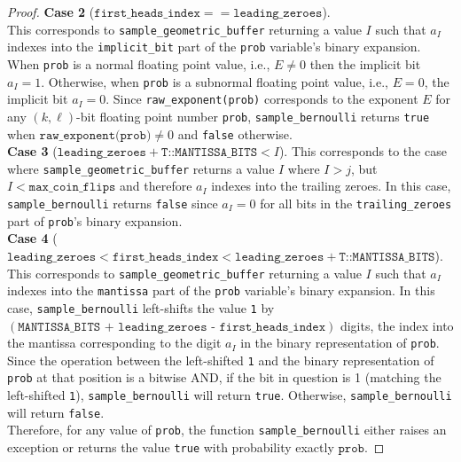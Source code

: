 \documentclass[11pt,a4paper]{article}
\theoremstyle{definition}
\begin{document}
\begin{proof}
\noindent\textbf{Case 2} ($\texttt{first\_heads\_index} == \texttt{leading\_zeroes}$). \\
\noindent This corresponds to \texttt{sample\_geometric\_buffer} returning a value $I$ such that $a_I$ indexes into the \texttt{implicit\_bit} part of the  \texttt{prob} variable's binary expansion. When \texttt{prob} is a normal floating point value, i.e., $E \ne 0$ then the implicit bit $a_I = 1$. Otherwise, when \texttt{prob} is a subnormal floating point value, i.e., $E = 0$, the implicit bit $a_I = 0$. Since \texttt{raw\_exponent(prob)} corresponds to the exponent $E$ for any $(k,\ell)$-bit floating point number \texttt{prob}, \texttt{sample\_bernoulli} returns \texttt{true} when $\texttt{raw\_exponent(prob)} \ne 0$ and \texttt{false} otherwise. \\


\noindent\textbf{Case 3} ($\texttt{leading\_zeroes}  + \texttt{T::MANTISSA\_BITS} < I$). This corresponds to the case where  \texttt{sample\_geometric\_buffer} returns a value $I$ where $I > j$, but $I < \texttt{max\_coin\_flips}$ and therefore $a_I$ indexes into the trailing zeroes. In this case, \texttt{sample\_bernoulli} returns \texttt{false} since $a_I = 0$ for all bits in the \texttt{trailing\_zeroes} part of \texttt{prob}'s binary expansion. \\

\noindent\textbf{Case 4} ($ \texttt{leading\_zeroes} < \texttt{first\_heads\_index}  <  \texttt{leading\_zeroes}  + \texttt{T::MANTISSA\_BITS}$). \\
\noindent This corresponds to \texttt{sample\_geometric\_buffer} returning a value $I$ such that $a_I$ indexes into the \texttt{mantissa} part of the  \texttt{prob} variable's binary expansion. In this case, 
\texttt{sample\_bernoulli}  left-shifts the value \texttt{1} by  $(\texttt{MANTISSA\_BITS + leading\_zeroes - first\_heads\_index})$ digits, the index into the mantissa corresponding to the digit $a_I$ in the binary representation of \texttt{prob}. Since the operation between the left-shifted \texttt{1} and the binary representation of \texttt{prob} at that position is a bitwise AND, if the bit in question is 1 (matching the left-shifted \texttt{1}), \texttt{sample\_bernoulli} will return \texttt{true}. Otherwise, \texttt{sample\_bernoulli} will return \texttt{false}. \\


\noindent Therefore, for any value of \texttt{prob}, the function \texttt{sample\_bernoulli} either raises an exception or returns the value \texttt{true} with probability exactly $\texttt{prob}$.  
\end{proof}
\end{document}
